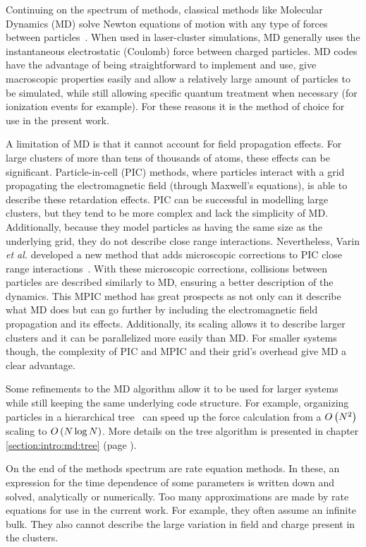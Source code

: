 Continuing on the spectrum of methods, classical methods like Molecular
Dynamics (MD) solve Newton
equations of motion with any type of forces between particles~\cite{Skeel1998}.
When used in
laser-cluster simulations, MD generally uses the instantaneous electrostatic
(Coulomb) force between charged particles. MD codes have the advantage of being
straightforward to implement and use, give macroscopic properties easily and allow a
relatively large amount of particles to be simulated, while still allowing
specific quantum treatment when necessary (for ionization events for example). For
these reasons it is the method of choice for use in the present work.

A limitation of MD is that it cannot account for field propagation effects. For
large clusters of more than tens of thousands of atoms, these effects can be
significant. Particle-in-cell (PIC) methods, where particles interact with a grid propagating the
electromagnetic field (through Maxwell's equations),
is able to describe these retardation effects. PIC can be successful in
modelling large clusters, but they tend to be more complex and lack the
simplicity of MD. Additionally, because they model particles as having the same
size as the underlying grid, they do not describe close range interactions.
Nevertheless, Varin \textit{et al.} developed a new method that adds microscopic
corrections to PIC close range interactions~\cite{Varin2012}. With these microscopic
corrections, collisions between particles are described similarly to MD, ensuring
a better description of the dynamics. This MPIC method has great prospects
as not only can it describe what MD does but can go further by including the
electromagnetic field propagation and its effects. Additionally, its scaling
allows it to describe larger clusters and it can be parallelized more easily
than MD. For smaller systems though, the complexity of PIC and MPIC and their
grid's overhead give MD a clear advantage.

Some refinements to the MD algorithm allow it to be used for larger systems
while still keeping the same underlying code structure. For example, organizing
particles in a hierarchical tree~\cite{Barnes1986,Gibbon2002} can speed up the force
calculation from a $O\left( N^2 \right)$ scaling to $O\left( N \log{N} \right)$. More details on the
tree algorithm is presented in chapter \ref{section:intro:md:tree} (page
\pageref{section:intro:md:tree}).

On the end of the methods spectrum are rate equation methods. In these, an
expression for the time dependence of some parameters is written down and solved,
analytically or numerically. Too many approximations
are made by rate equations for use in the current work. For example, they often
assume an infinite bulk. They also cannot describe the large variation in field
and charge present in the clusters.


